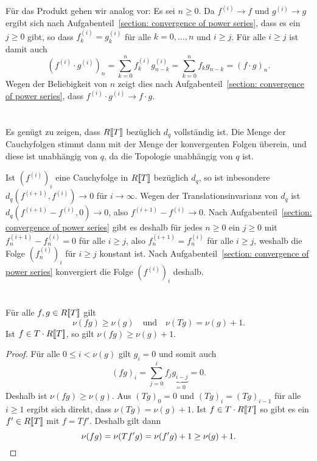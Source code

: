 \documentclass[a4paper, 10pt, numbers=noenddot]{scrartcl}
\begin{document}
Für das Produkt gehen wir analog vor:
Es sei $n \geq 0$.
Da $f^{(i)} \to f$ und $g^{(i)} \to g$ ergibt sich nach Aufgabenteil~\ref{section: convergence of power series}, dass es ein $j \geq 0$ gibt, so dass $f^{(i)}_k = g^{(i)}_k$ für alle $k = 0, \dotsc, n$ und $i \geq j$.
Für alle $i \geq j$ ist damit auch
\[
    (f^{(i)} \cdot g^{(i)})_n
  = \sum_{k = 0}^n f^{(i)}_k g^{(i)}_{n-k}
  = \sum_{k = 0}^n f_k g_{n-k}
  = (f \cdot g)_n.
\]
Wegen der Beliebigkeit von $n$ zeigt dies nach Aufgabenteil~\ref{section: convergence of power series}, dass $f^{(i)} \cdot g^{(i)} \to f \cdot g$.






\section{}

Es genügt zu zeigen, dass $R[\![T]\!]$ bezüglich $d_q$ vollständig ist.
Die Menge der Cauchyfolgen stimmt dann mit der Menge der konvergenten Folgen überein, und diese ist unabhängig von $q$, da die Topologie unabhängig von $q$ ist.

Ist $(f^{(i)})_i$ eine Cauchyfolge in $R[\![T]\!]$ bezüglich $d_q$, so ist inbesondere $d_q(f^{(i+1)}, f^{(i)}) \to 0$ für $i \to \infty$.
Wegen der Translationsinvarianz von $d_q$ ist $d_q(f^{(i+1)} - f^{(i)}, 0) \to 0$, also $f^{(i+1)} - f^{(i)} \to 0$.
Nach Aufgabenteil~\ref{section: convergence of power series} gibt es deshalb für jedes $n \geq 0$ ein $j \geq 0$ mit $f^{(i+1)}_n - f^{(i)}_n = 0$ für alle $i \geq j$, also $f^{(i+1)}_n = f^{(i)}_n$ für alle $i \geq j$, weshalb die Folge $(f^{(i)}_n)_i$ für $i \geq j$ konstant ist.
Nach Aufgabenteil~\ref{section: convergence of power series} konvergiert die Folge $(f^{(i)})_i$ deshalb.





\section{}

\begin{claim}
  Für alle $f, g \in R[\![T]\!]$ gilt
  \[
    \nu(f g) \geq \nu(g)
    \quad\text{und}\quad
    \nu(T g) = \nu(g) + 1.
  \]
  Ist $f \in T \cdot R[\![T]\!]$, so gilt $\nu(f g) \geq \nu(g) + 1$.
\end{claim}
\begin{proof}
  Für alle $0 \leq i < \nu(g)$ gilt $g_i = 0$ und somit auch
  \[
      (f g)_i
    = \sum_{j=0}^i f_j \underbrace{g_{i-j}}_{=0}
    = 0.
  \]
  Deshalb ist $\nu(f g) \geq \nu(g)$.  
  Aus $(T g)_0 = 0$ und $(T g)_i = (T g)_{i-1}$ für alle $i \geq 1$ ergibt sich direkt, dass $\nu(T g) = \nu(g) + 1$.
  Ist $f \in T \cdot R[\![T]\!]$ so gibt es ein $f' \in R[\![T]\!]$ mit $f = T f'$.
  Deshalb gilt dann
  \[
          \nu(f g)
    =     \nu(T f' g)
    =     \nu(f' g) + 1
    \geq  \nu(g) + 1.
    \qedhere
  \]
\end{proof}
\end{document}
